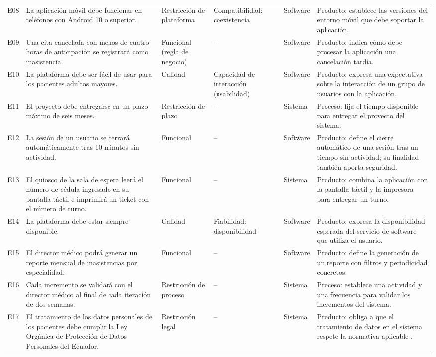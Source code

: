 \documentclass[10pt,letterpaper,landscape]{article}
\begin{document}
\begin{longtable}{@{}p{0.48in}p{2.25in}p{1.35in}p{1.48in}p{1.00in}p{2.95in}@{}}
E08 & La aplicación móvil debe funcionar en teléfonos con Android 10 o superior. & Restricción de plataforma & Compatibilidad: coexistencia & Software & Producto: establece las versiones del entorno móvil que debe soportar la aplicación. \\
E09 & Una cita cancelada con menos de cuatro horas de anticipación se registrará como inasistencia. & Funcional (regla de negocio) & -- & Software & Producto: indica cómo debe procesar la aplicación una cancelación tardía. \\
E10 & La plataforma debe ser fácil de usar para los pacientes adultos mayores. & Calidad & Capacidad de interacción (usabilidad) & Software & Producto: expresa una expectativa sobre la interacción de un grupo de usuarios con la aplicación. \\
E11 & El proyecto debe entregarse en un plazo máximo de seis meses. & Restricción de plazo & -- & Sistema & Proceso: fija el tiempo disponible para entregar el proyecto del sistema. \\
E12 & La sesión de un usuario se cerrará automáticamente tras 10 minutos sin actividad. & Funcional & -- & Software & Producto: define el cierre automático de una sesión tras un tiempo sin actividad; su finalidad también aporta seguridad. \\
E13 & El quiosco de la sala de espera leerá el número de cédula ingresado en su pantalla táctil e imprimirá un ticket con el número de turno. & Funcional & -- & Sistema & Producto: combina la aplicación con la pantalla táctil y la impresora para entregar un turno. \\
E14 & La plataforma debe estar siempre disponible. & Calidad & Fiabilidad: disponibilidad & Software & Producto: expresa la disponibilidad esperada del servicio de software que utiliza el usuario. \\
E15 & El director médico podrá generar un reporte mensual de inasistencias por especialidad. & Funcional & -- & Software & Producto: define la generación de un reporte con filtros y periodicidad concretos. \\
E16 & Cada incremento se validará con el director médico al final de cada iteración de dos semanas. & Restricción de proceso & -- & Sistema & Proceso: establece una actividad y una frecuencia para validar los incrementos del sistema. \\
E17 & El tratamiento de los datos personales de los pacientes debe cumplir la Ley Orgánica de Protección de Datos Personales del Ecuador. & Restricción legal & -- & Sistema & Producto: obliga a que el tratamiento de datos en el sistema respete la normativa aplicable \cite{lopdp2021}. \\

\end{longtable}
\end{document}

